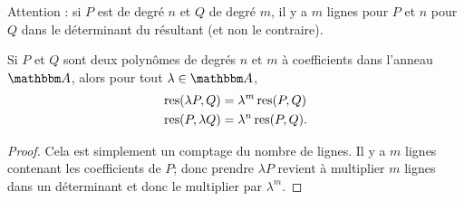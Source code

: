 Attention : si \( P\) est de degré \( n\) et \( Q\) de degré \( m\), il y a \( m\) lignes pour \( P\) et \( n\) pour \( Q\) dans le déterminant du résultant (et non le contraire).

\begin{lemma}       \label{LemBFrhgnA}
    Si \( P\) et \( Q\) sont deux polynômes de degrés \( n\) et \( m\) à coefficients dans l'anneau \( \eA\), alors pour tout \( \lambda\in \eA\),
    \begin{subequations}
        \begin{align}
            \operatorname{res}(\lambda P,Q)&=\lambda^m\operatorname{res}(P,Q)\\
            \operatorname{res}(P,\lambda Q)&=\lambda^n\operatorname{res}(P,Q).
        \end{align}
    \end{subequations}
\end{lemma}

\begin{proof}
    Cela est simplement un comptage du nombre de lignes. Il y a \( m\) lignes contenant les coefficients de \( P\); donc prendre \( \lambda P\) revient à multiplier \( m\) lignes dans un déterminant et donc le multiplier par \( \lambda^m\).
\end{proof}

